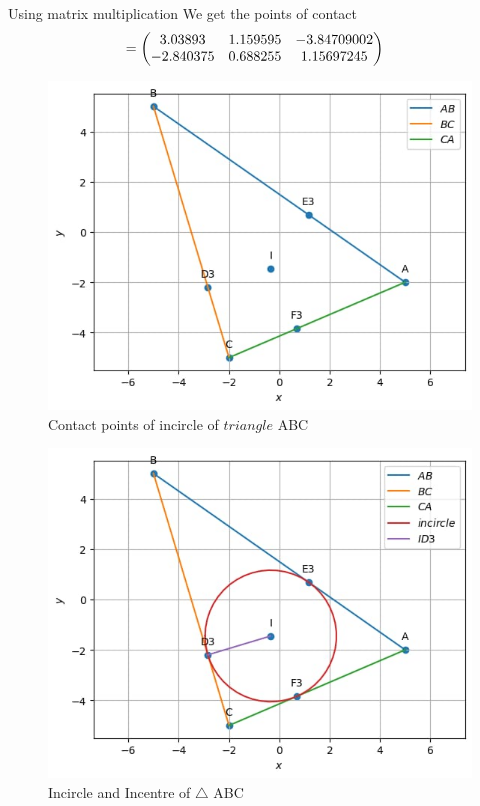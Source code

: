 \documentclass[10pt]{book}
\begin{document}
\begin{enumerate}[label=\thesubsection.\arabic*.,ref=\thesubsection.\theenumi]
Using matrix multiplication We get the points of contact 
\begin{align}
    &= \begin{pmatrix} 3.03893 & 1.159595 & -3.84709002\\ -2.840375 & 0.688255 & 1.15697245\end{pmatrix}
\end{align}
\begin{figure}[H]
    \centering
   \includegraphics{figs/1000.jpg}
    \caption{Contact points of incircle of $triangle$ ABC}
    \label{fig:mat_ang1}
\end{figure}
\begin{figure}[H]
    \centering
    \includegraphics{figs/3000.jpg}
    \caption{Incircle and Incentre of $\triangle$ ABC }
    \label{fig:mat_ang2}
\end{figure}
\end{enumerate}
\end{document}
